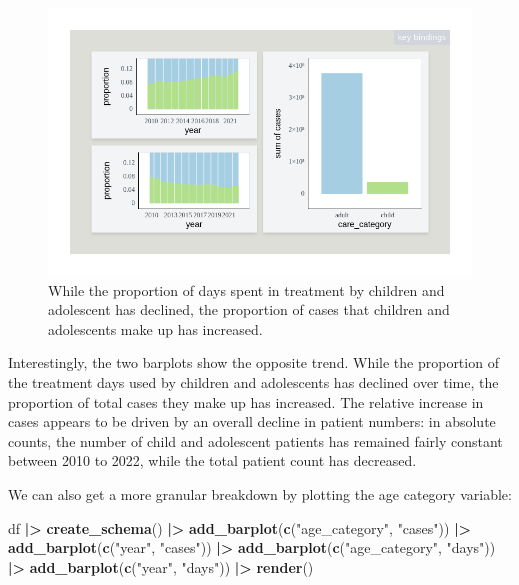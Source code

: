 \documentclass[
]{book}
\newenvironment{Shaded}{\begin{snugshade}}{\end{snugshade}}
\newcommand{\FunctionTok}[1]{\textcolor[rgb]{0.13,0.29,0.53}{\textbf{#1}}}
\newcommand{\NormalTok}[1]{#1}
\newcommand{\SpecialCharTok}[1]{\textcolor[rgb]{0.81,0.36,0.00}{\textbf{#1}}}
\newcommand{\StringTok}[1]{\textcolor[rgb]{0.31,0.60,0.02}{#1}}
\theoremstyle{definition}
\theoremstyle{definition}
\theoremstyle{definition}
\theoremstyle{definition}
\theoremstyle{remark}
\begin{document}
\begin{figure}

{\centering \includegraphics[width=1\linewidth,height=1\textheight]{./figures/example-cases-days-children-marked} 

}

\caption{While the proportion of days spent in treatment by children and adolescent has declined, the proportion of cases that children and adolescents make up has increased.}\label{fig:example-cases-days-children-marked}
\end{figure}

Interestingly, the two barplots show the opposite trend. While the proportion of the treatment days used by children and adolescents has declined over time, the proportion of total cases they make up has increased. The relative increase in cases appears to be driven by an overall decline in patient numbers: in absolute counts, the number of child and adolescent patients has remained fairly constant between 2010 to 2022, while the total patient count has decreased.

We can also get a more granular breakdown by plotting the age category variable:

\begin{Shaded}
\begin{Highlighting}[]
\NormalTok{df }\SpecialCharTok{|\textgreater{}}
  \FunctionTok{create\_schema}\NormalTok{() }\SpecialCharTok{|\textgreater{}}
  \FunctionTok{add\_barplot}\NormalTok{(}\FunctionTok{c}\NormalTok{(}\StringTok{"age\_category"}\NormalTok{, }\StringTok{"cases"}\NormalTok{)) }\SpecialCharTok{|\textgreater{}}
  \FunctionTok{add\_barplot}\NormalTok{(}\FunctionTok{c}\NormalTok{(}\StringTok{"year"}\NormalTok{, }\StringTok{"cases"}\NormalTok{)) }\SpecialCharTok{|\textgreater{}}
  \FunctionTok{add\_barplot}\NormalTok{(}\FunctionTok{c}\NormalTok{(}\StringTok{"age\_category"}\NormalTok{, }\StringTok{"days"}\NormalTok{)) }\SpecialCharTok{|\textgreater{}}
  \FunctionTok{add\_barplot}\NormalTok{(}\FunctionTok{c}\NormalTok{(}\StringTok{"year"}\NormalTok{, }\StringTok{"days"}\NormalTok{)) }\SpecialCharTok{|\textgreater{}}
  \FunctionTok{render}\NormalTok{()}
\end{Highlighting}
\end{Shaded}
\end{document}
